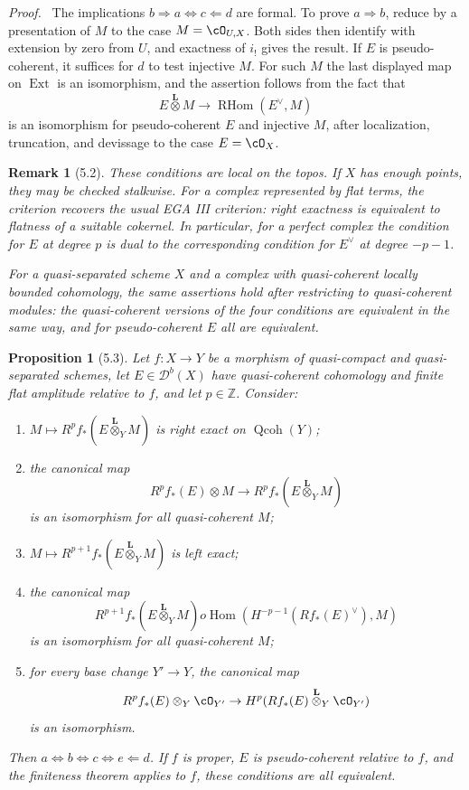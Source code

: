 \documentclass[11pt]{article}
\theoremstyle{plain}
\newtheorem*{proposition*}{Proposition}
\newtheorem*{remark*}{Remark}
\theoremstyle{definition}
\theoremstyle{remark}
\newenvironment{prooftext}{\par\noindent\textit{Proof.}\ }{\par\medskip}
\newcommand{\ZZ}{\mathbb Z}
\newcommand{\D}{\mathcal D}\newcommand{\E}{\mathcal E}\newcommand{\F}{\mathcal F}
\DeclareMathOperator{\Hom}{Hom}
\DeclareMathOperator{\Ext}{Ext}
\DeclareMathOperator{\RHom}{RHom}
\providecommand{\Qcoh}{\operatorname{Qcoh}}
\providecommand{\Ltens}{\overset{\mathbf L}{\otimes}}
\begin{document}
\begin{prooftext}
The implications $b\Rightarrow a\Leftrightarrow c\Leftarrow d$ are formal. To prove $a\Rightarrow b$, reduce by a presentation of $M$ to the case $M=\cO_{U,X}$. Both sides then identify with extension by zero from $U$, and exactness of $i_!$ gives the result. If $E$ is pseudo-coherent, it suffices for $d$ to test injective $M$. For such $M$ the last displayed map on $\Ext$ is an isomorphism, and the assertion follows from the fact that
\[
E\Ltens M\to\RHom(E^\vee,M)
\]
is an isomorphism for pseudo-coherent $E$ and injective $M$, after localization, truncation, and devissage to the case $E=\cO_X$.
\end{prooftext}

\begin{remark*}[5.2]
These conditions are local on the topos. If $X$ has enough points, they may be checked stalkwise. For a complex represented by flat terms, the criterion recovers the usual EGA III criterion: right exactness is equivalent to flatness of a suitable cokernel. In particular, for a perfect complex the condition for $E$ at degree $p$ is dual to the corresponding condition for $E^\vee$ at degree $-p-1$.

For a quasi-separated scheme $X$ and a complex with quasi-coherent locally bounded cohomology, the same assertions hold after restricting to quasi-coherent modules: the quasi-coherent versions of the four conditions are equivalent in the same way, and for pseudo-coherent $E$ all are equivalent.
\end{remark*}

\begin{proposition*}[5.3]
Let $f:X\to Y$ be a morphism of quasi-compact and quasi-separated schemes, let $E\in\D^b(X)$ have quasi-coherent cohomology and finite flat amplitude relative to $f$, and let $p\in\ZZ$. Consider:
\begin{enumerate}[label=\alph*)]
\item $M\mapsto R^pf_*(E\Ltens_Y M)$ is right exact on $\Qcoh(Y)$;
\item the canonical map
\[
R^pf_*(E)\otimes M\to R^pf_*(E\Ltens_Y M)
\]
is an isomorphism for all quasi-coherent $M$;
\item $M\mapsto R^{p+1}f_*(E\Ltens_Y M)$ is left exact;
\item the canonical map
\[
R^{p+1}f_*(E\Ltens_Y M)	o\Hom(H^{-p-1}(Rf_*(E)^\vee),M)
\]
is an isomorphism for all quasi-coherent $M$;
\item for every base change $Y'\to Y$, the canonical map
\[
R^pf_*(E)\otimes_Y\cO_{Y'}\to H^p(Rf_*(E)\Ltens_Y\cO_{Y'})
\]
is an isomorphism.
\end{enumerate}
Then $a\Leftrightarrow b\Leftrightarrow c\Leftrightarrow e\Leftarrow d$. If $f$ is proper, $E$ is pseudo-coherent relative to $f$, and the finiteness theorem applies to $f$, these conditions are all equivalent.
\end{proposition*}
\end{document}
